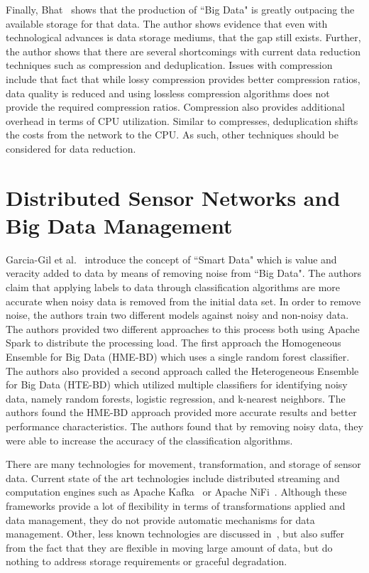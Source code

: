 Finally, Bhat~\cite{bhat2018data} shows that the production of ``Big Data" is greatly outpacing the available storage for that data. The author shows evidence that even with technological advances is data storage mediums, that the gap still exists. Further, the author shows that there are several shortcomings with current data reduction techniques such as compression and deduplication. Issues with compression include that fact that while lossy compression provides better compression ratios, data quality is reduced and using lossless compression algorithms does not provide the required compression ratios. Compression also provides additional overhead in terms of CPU utilization. Similar to compresses, deduplication shifts the costs from the network to the CPU. As such, other techniques should be considered for data reduction.

\section{Distributed Sensor Networks and Big Data Management}\label{sec:distributed-sensor-networks-and-big-data-management}

Garcia-Gil et al.~\cite{garcia2019enabling} introduce the concept of ``Smart Data" which is value and veracity added to data by means of removing noise from ``Big Data". The authors claim that applying labels to data through classification algorithms are more accurate when noisy data is removed from the initial data set. In order to remove noise, the authors train two different models against noisy and non-noisy data. The authors provided two different approaches to this process both using Apache Spark to distribute the processing load. The first approach the Homogeneous Ensemble for Big Data (HME-BD) which uses a single random forest classifier. The authors also provided a second approach called the Heterogeneous Ensemble for Big Data (HTE-BD) which utilized multiple classifiers for identifying noisy data, namely random forests, logistic regression, and k-nearest neighbors. The authors found the HME-BD approach provided more accurate results and better performance characteristics.  The authors found that by removing noisy data, they were able to increase the accuracy of the classification algorithms.

There are many technologies for movement, transformation, and storage of sensor data. Current state of the art technologies include distributed streaming and computation engines such as Apache Kafka~\cite{kreps2011kafka} or Apache NiFi~\cite{noauthor_apache_nodate}. Although these frameworks provide a lot of flexibility in terms of transformations applied and data management, they do not provide automatic mechanisms for data management. Other, less known technologies are discussed in~\cite{hughes2016survey}, but also suffer from the fact that they are flexible in moving large amount of data, but do nothing to address storage requirements or graceful degradation.

